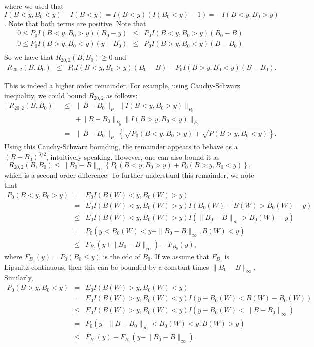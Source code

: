 \documentclass[11pt]{article}
\newcommand{\pl}{\parallel}
\begin{document}
where we used that $I(B<y,B_0<y)-I(B<y)=I(B<y)(I(B_0<y)-1)=-I(B<y,B_0>y)$.
Note that both terms are positive. 
Note that
\begin{eqnarray*}
0\leq P_0I(B<y,B_0>y)(B_0-y) &\leq& P_0 I(B<y,B_0>y)(B_0-B)\\
0\leq P_0I(B>y,B_0<y)(y-B_0) &\leq&P_0I(B>y,B_0<y)(B-B_0)\\
\end{eqnarray*}
So we have that $R_{20,2}(B,B_0)\geq 0$ and 
\begin{eqnarray*}
R_{20,2}(B,B_0)&\leq & P_0I(B<y,B_0>y)(B_0-B)
+P_0I(B>y,B_0<y)(B-B_0).
\end{eqnarray*}

This is indeed a higher order remainder. For example, using Cauchy-Schwarz inequality, we could bound $R_{20,2}$ as follows:
\begin{eqnarray*}
\mid R_{20,2}(B,B_0)\mid &\leq& \pl B-B_0\pl_{P_0}\pl I(B<y,B_0>y)\pl_{P_0}\\
&&+\pl B-B_0\pl_{P_0}\pl I(B>y,B_0<y)\pl_{P_0}\\
&=& \pl B-B_0\pl_{P_0}\left\{\sqrt{P_0(B<y,B_0>y)}+\sqrt{P(B>y,B_0<y)}\right\}.
\end{eqnarray*}
Using this Cauchy-Schwarz bounding, the remainder appears to behave as a $(B-B_0)^{3/2}$, intuitively speaking. 
However, one can also bound it as 
\[
R_{20,2}(B,B_0)\leq  \pl B_0-B\pl_{\infty}\left\{P_0(B<y,B_0>y)+P_0(B>y,B_0<y)\right\},\]
which  is a second order difference. 
To further understand this remainder, we note that
\begin{eqnarray*}
P_0(B<y,B_0>y)&=&E_0 I(B(W)<y,B_0(W)>y)\\
&=& E_0 I(B(W)<y,B_0(W)>y)I(B_0(W)-B(W)>B_0(W)-y)\\
&\leq &E_0I(B(W)<y,B_0(W)>y)I(\pl B_0-B\pl_{\infty}>B_0(W)-y)\\
&=& P_0(y<B_0(W)<y+\pl B_0-B\pl_{\infty},B(W)<y)\\
&\leq & F_{B_0}(y+\pl B_0-B\pl_{\infty})-F_{B_0}(y),\end{eqnarray*}
where $F_{B_0}(y)=P_0(B_0\leq y)$ is the cdc  of $B_0$.
If we assume that $F_{B_0}$ is Lipsnitz-continuous, then this can be bounded by 
a constant times $\pl B_0-B\pl_{\infty}$.
Similarly,
\begin{eqnarray*}
P_0(B>y,B_0<y)&=&E_0 I(B(W)>y,B_0(W)<y)\\
&=& E_0 I(B(W)>y,B_0(W)<y)I(y-B_0(W)<B(W)-B_0(W)) \\
&\leq & E_0I(B(W)>y,B_0(W)<y) I(y-B_0(W)<\pl B-B_0\pl_{\infty})\\
&=& P_0(y-\pl B-B_0\pl_{\infty}<B_0(W)<y,B(W)>y)\\
&\leq & F_{B_0}(y)-F_{B_0}(y-\pl B_0-B\pl_{\infty}).\end{eqnarray*}
\end{document}

